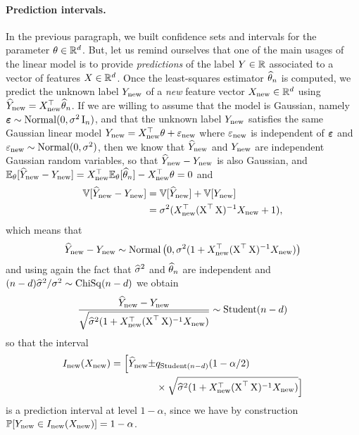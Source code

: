 \paragraph{Prediction intervals.}

In the previous paragraph, we built confidence sets and intervals for the parameter $\theta \in \R^d$.
But, let us remind ourselves that one of the main usages of the linear model is to provide \emph{predictions} of the label $Y \in \R$ associated to a vector of features $X \in \R^d$.
Once the least-squares estimator $\wh \theta_n$ is computed, we predict the unknown label $Y_{\new}$ of a \emph{new}%
 feature vector $X_{\new} \in \R^d$ using $\wh Y_{\new} = X_{\new}^\top \wh \theta_n$.
If we are willing to assume that the model is Gaussian, namely $\beps \sim \nor(0, \sigma^2 \bI_n)$, and that the unknown label $Y_{\new}$ satisfies the same Gaussian linear model $Y_{\new} = X_{\new}^\top \theta + \eps_{\new}$ where $\eps_{\new}$ is independent of $\beps$ and
 $\eps_{\new} \sim \nor(0, \sigma^2)$, then we know that $\wh Y_{\new}$ and $Y_{\new}$ are independent Gaussian random variables, so that $\wh Y_{\new} - Y_{\new}$ is also Gaussian, and
 $\E_\theta[\wh Y_{\new} - Y_{\new}] = X_{\new}^\top \E_\theta[\wh \theta_n] - X_{\new}^\top \theta = 0$ and
 \begin{align*}
 	\var[\wh Y_{\new} - Y_{\new}] &= \var[\wh Y_{\new}] + \var[Y_{\new}] \\
 	&= \sigma^2 (X_{\new}^\top (\bX^\top \bX)^{-1} X_{\new} + 1),
 \end{align*}
which means that
\begin{equation*}
	\wh Y_{\new} - Y_{\new} \sim \nor\big(0, \sigma^2 (1 + X_{\new}^\top (\bX^\top \bX)^{-1} X_{\new})\big)
\end{equation*}
and using again the fact that $\wh \sigma^2$ and $\wh \theta_n$ are independent and $(n-d) \wh \sigma^2 / \sigma^2 \sim \chisq(n -d)$ we obtain
\begin{equation*}
	\frac{\wh Y_{\new} - Y_{\new}}{\sqrt{\wh \sigma^2  (1 + X_{\new}^\top (\bX^\top \bX)^{-1} X_{\new}) }} \sim \stu(n-d)
\end{equation*}
so that the interval
\begin{align*}
	I_{\new}(X_{\new}) = \Big[ \wh Y_{\new} \pm &q_{\stu(n-d)}(1 - \alpha / 2) \\
	& \times \sqrt{\wh \sigma^2  (1 + X_{\new}^\top (\bX^\top \bX)^{-1} X_{\new}) } \Big]
\end{align*}
is a prediction interval at level $1 - \alpha$, since we have by construction $\P[Y_{\new} \in I_{\new}(X_{\new})] = 1 - \alpha$.


